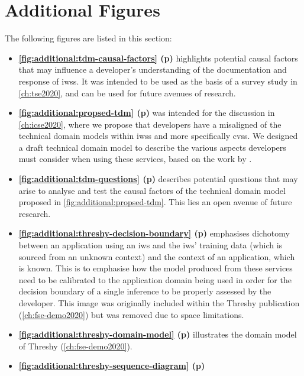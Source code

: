 \chapter{Additional Figures}
\label{ch:additional-materials}

The following figures are listed in this section:

\begin{itemize}[leftmargin=0mm]
\item \textbf{\cref{fig:additional:tdm-causal-factors} (p\pageref{fig:additional:tdm-causal-factors})}
  highlights potential causal factors that may influence a developer's understanding of the documentation and response of \glspl{iws}. It was intended to be used as the basis of a survey study in \cref{ch:tse2020}, and can be used for future avenues of research.
\item \textbf{\cref{fig:additional:propsed-tdm} (p\pageref{fig:additional:propsed-tdm})}
  was intended for the discussion in \cref{ch:icse2020}, where we propose that developers have a misaligned of the technical domain models within \glspl{iws} and more specifically \glspl{cvs}. We designed a draft technical domain model to describe the various aspects developers must consider when using these services, based on the work by \citet{Barnett:2018Kx}. 
\item \textbf{\cref{fig:additional:tdm-questions} (p\pageref{fig:additional:tdm-questions})}
  describes potential questions that may arise to analyse and test the causal factors of the technical domain model proposed in \cref{fig:additional:propsed-tdm}. This lies an open avenue of future research.
\item \textbf{\cref{fig:additional:threshy-decision-boundary} (p\pageref{fig:additional:threshy-decision-boundary})}
  emphasises dichotomy between an application using an \gls{iws} and the \gls{iws}' training data (which is sourced from an unknown context) and the context of an application, which is known. This is to emphasise how the model produced from these services need to be calibrated to the application domain being used in order for the decision boundary of a single inference to be properly assessed by the developer. This image was originally included within the Threshy publication (\cref{ch:fse-demo2020}) but was removed due to space limitations.
\item \textbf{\cref{fig:additional:threshy-domain-model} (p\pageref{fig:additional:threshy-domain-model})}
  illustrates the domain model of Threshy (\cref{ch:fse-demo2020}).
\item \textbf{\cref{fig:additional:threshy-sequence-diagram} (p\pageref{fig:additional:threshy-sequence-diagram})}

\end{itemize}
